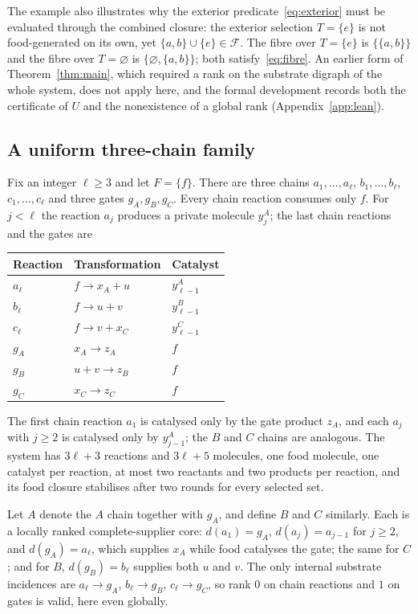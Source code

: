 \documentclass[11pt,a4paper]{article}
\theoremstyle{plain}
\theoremstyle{definition}
\theoremstyle{remark}
\newcommand{\FF}{\mathcal F}
\begin{document}
The example also illustrates why the exterior predicate~\eqref{eq:exterior} must be evaluated through the combined closure: the exterior selection $T=\{e\}$ is not food-generated on its own, yet $\{a,b\}\cup\{e\}\in\FF$. The fibre over $T=\{e\}$ is $\{\{a,b\}\}$ and the fibre over $T=\varnothing$ is $\{\varnothing,\{a,b\}\}$; both satisfy~\eqref{eq:fibre}. An earlier form of Theorem~\ref{thm:main}, which required a rank on the substrate digraph of the whole system, does not apply here, and the formal development records both the certificate of $U$ and the nonexistence of a global rank (Appendix~\ref{app:lean}).

\subsection{A uniform three-chain family}\label{sec:family}

Fix an integer $\ell\ge3$ and let $F=\{f\}$. There are three chains $a_1,\dots,a_\ell$, $b_1,\dots,b_\ell$, $c_1,\dots,c_\ell$ and three gates $g_A,g_B,g_C$. Every chain reaction consumes only $f$. For $j<\ell$ the reaction $a_j$ produces a private molecule $y^A_j$; the last chain reactions and the gates are
\begin{center}
\begin{tabular}{@{}lll@{}}\toprule
Reaction & Transformation & Catalyst\\\midrule
$a_\ell$ & $f\to x_A+u$ & $y^A_{\ell-1}$\\
$b_\ell$ & $f\to u+v$ & $y^B_{\ell-1}$\\
$c_\ell$ & $f\to v+x_C$ & $y^C_{\ell-1}$\\
$g_A$ & $x_A\to z_A$ & $f$\\
$g_B$ & $u+v\to z_B$ & $f$\\
$g_C$ & $x_C\to z_C$ & $f$\\\bottomrule
\end{tabular}
\end{center}
The first chain reaction $a_1$ is catalysed only by the gate product $z_A$, and each $a_j$ with $j\ge2$ is catalysed only by $y^A_{j-1}$; the $B$ and $C$ chains are analogous. The system has $3\ell+3$ reactions and $3\ell+5$ molecules, one food molecule, one catalyst per reaction, at most two reactants and two products per reaction, and its food closure stabilises after two rounds for every selected set.

Let $A$ denote the $A$ chain together with $g_A$, and define $B$ and $C$ similarly. Each is a locally ranked complete-supplier core: $d(a_1)=g_A$, $d(a_j)=a_{j-1}$ for $j\ge2$, and $d(g_A)=a_\ell$, which supplies $x_A$ while food catalyses the gate; the same for $C$; and for $B$, $d(g_B)=b_\ell$ supplies both $u$ and $v$. The only internal substrate incidences are $a_\ell\to g_A$, $b_\ell\to g_B$, $c_\ell\to g_C$, so rank $0$ on chain reactions and $1$ on gates is valid, here even globally.
\end{document}
